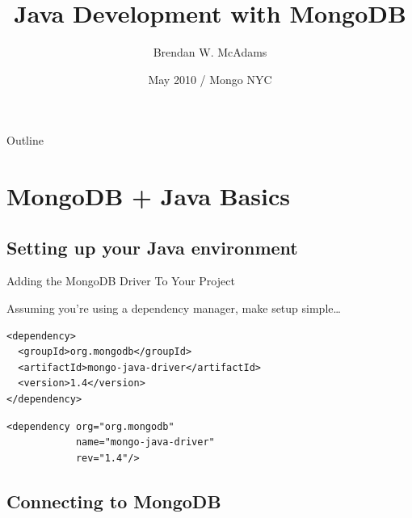 \documentclass{beamer}
\title[Java Development with MongoDB] %
{Java Development with MongoDB}
\author[Brendan W. McAdams] 
{Brendan W. McAdams\\
}
\institute[Novus Partners, Inc.] %
{ Novus Partners, Inc.\\
  http://novus.com }
\date[Mongo NYC, May 2010] %
{May 2010 / Mongo NYC}
\begin{document}
\begin{frame}
  \titlepage
\end{frame}

\begin{frame}{Outline}
  \tableofcontents
\end{frame}




\section{MongoDB + Java Basics}

\subsection[Getting Started]{Setting up your Java environment}

\begin{frame}[fragile]{Adding the MongoDB Driver To Your Project}
 
  Assuming you're using a dependency manager, make setup simple\dots
    \pause
\begin{lstlisting}[caption=Maven Dependency]
<dependency>
  <groupId>org.mongodb</groupId>
  <artifactId>mongo-java-driver</artifactId>
  <version>1.4</version>
</dependency>
\end{lstlisting}

\begin{lstlisting}[caption=Ivy Dependency]
<dependency org="org.mongodb" 
            name="mongo-java-driver" 
            rev="1.4"/>
\end{lstlisting}
\end{frame}

\subsection[Connecting to MongoDB]{Connecting to MongoDB}
\end{document}
